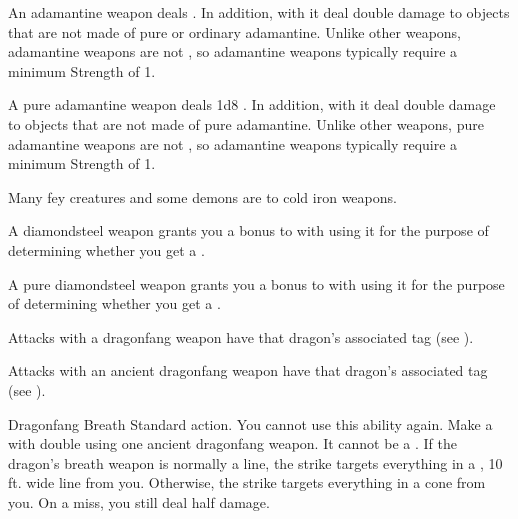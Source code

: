        An adamantine weapon deals  .
      In addition,  with it deal double damage to objects that are not made of pure or ordinary adamantine.
      Unlike other weapons, adamantine weapons are not , so  adamantine weapons typically require a minimum Strength of 1.

       A pure adamantine weapon deals \plus1d8 .
      In addition,  with it deal double damage to objects that are not made of pure adamantine.
      Unlike other weapons, pure adamantine weapons are not , so  adamantine weapons typically require a minimum Strength of 1.

       Many fey creatures and some demons are  to cold iron weapons.

       A diamondsteel weapon grants you a  bonus to  with  using it for the purpose of determining whether you get a .

       A pure diamondsteel weapon grants you a  bonus to  with  using it for the purpose of determining whether you get a .

       Attacks with a dragonfang weapon have that dragon's associated tag (see ).

       Attacks with an ancient dragonfang weapon have that dragon's associated tag (see ).
      \begin{activeability}{Dragonfang Breath}
        \abilityusagetime Standard action.
        \abilitycost You  cannot use this ability again.
        \rankline
        Make a  with double  using one ancient dragonfang weapon.
        It cannot be a .
        If the dragon's breath weapon is normally a line, the strike targets everything in a \arealarge, 10 ft. wide line from you.
        Otherwise, the strike targets everything in a \areamed cone from you.
        On a miss, you still deal half damage.
      \end{activeability}

